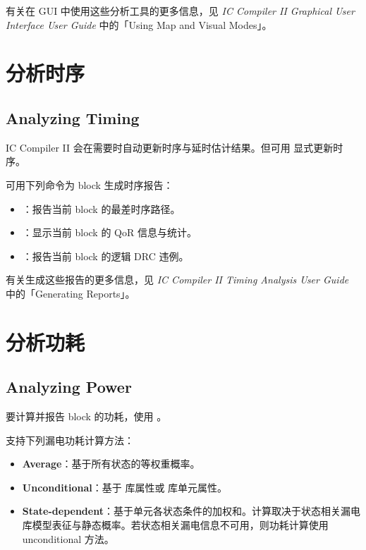 有关在 GUI 中使用这些分析工具的更多信息，见 \textit{IC Compiler II Graphical User Interface User Guide} 中的「Using Map and Visual Modes」。

\section{分析时序}
\subsection*{Analyzing Timing}

IC Compiler II 会在需要时自动更新时序与延时估计结果。但可用  显式更新时序。

可用下列命令为 block 生成时序报告：
\begin{itemize}
  \item {}：报告当前 block 的最差时序路径。
  \item {}：显示当前 block 的 QoR 信息与统计。
  \item {}：报告当前 block 的逻辑 DRC 违例。
\end{itemize}

有关生成这些报告的更多信息，见 \textit{IC Compiler II Timing Analysis User Guide} 中的「Generating Reports」。

\section{分析功耗}
\subsection*{Analyzing Power}

要计算并报告 block 的功耗，使用 。

 支持下列漏电功耗计算方法：
\begin{itemize}
  \item \textbf{Average}：基于所有状态的等权重概率。
  \item \textbf{Unconditional}：基于  库属性或  库单元属性。
  \item \textbf{State-dependent}：基于单元各状态条件的加权和。计算取决于状态相关漏电库模型表征与静态概率。若状态相关漏电信息不可用，则功耗计算使用 unconditional 方法。
\end{itemize}

